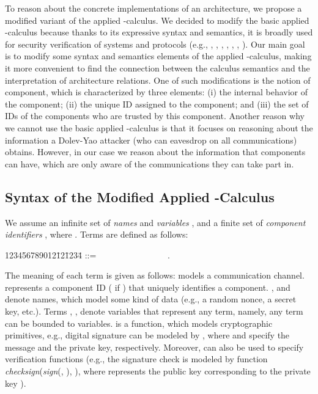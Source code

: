\documentclass{llncs}
\begin{document}
To reason about the concrete implementations of an architecture, we propose a modified variant of the applied -calculus. 
We decided to modify the basic applied -calculus  \cite{fournet01mobile} because thanks to its expressive syntax 
and semantics, it is broadly used for security verification of systems and protocols (e.g., 
\cite{Fournet:2002}, \cite{Delaune:2008}, \cite{DongJP:2010}, \cite{Li:2009}, \cite{Delaune:2009}, \cite{BackesZero:2008}, 
\cite{Kremer:2005}).  
Our main goal is to modify some syntax and semantics elements of the applied -calculus, 
making it more convenient to find the connection between the calculus semantics and the interpretation of 
architecture relations. One of such modifications is the notion of component, which is characterized 
by three elements: (i) the internal behavior of the component; (ii) the unique ID assigned to the component; and (iii) 
the set of IDs of the components who are trusted by this component. Another reason why we cannot use 
the basic applied -calculus is that it focuses on reasoning about the information a 
Dolev-Yao attacker (who can eavesdrop on all communications) obtains. However, in our case we reason about 
the information that components can have, which are only 
aware of the communications they can take part in.

\subsection{Syntax of the Modified Applied -Calculus}
\label{sec:calcsyntax}
We assume an infinite set of \textit{names}  and  
\textit{variables} , and a finite set of  \textit{component identifiers} 
, where   . 
Terms are defined as follows:
\begin{tabbing}
    123456789012\=12\=1234\=\kill
    \>  \> ::= \> \ \ \ \  \ \   \ \  \ \ \ \  \ \  \ \  . 
\end{tabbing}
  
\noindent  The meaning of each term is given as follows:   
 models a communication channel.   
 represents a component ID (   if   ) that uniquely identifies a component. 
,  and  denote names, which model some kind of data (e.g., a random nonce, a secret key, etc.).  
Terms , ,  denote variables that represent any term, namely, 
any term can be bounded to variables. 
 is a function, which models 
cryptographic primitives, e.g., digital signature 
can be modeled by , where  
and  specify the message and the private key, respectively. Moreover,  
can also be used to specify verification functions (e.g., the signature 
check is modeled by function 
\textit{checksign}(\textit{sign}(, ), ), where 
 represents the public key corresponding to the private key ).  
  
\end{document}

